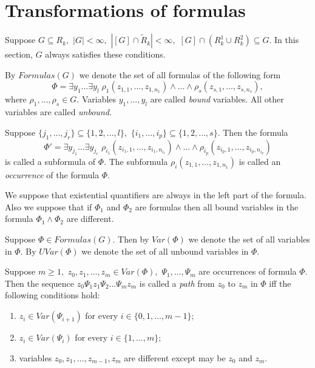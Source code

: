 \documentclass{au}
\theoremstyle{plain}
\theoremstyle{definition}
\theoremstyle{remark}
\numberwithin{equation}{section}
\begin{document}
\section{Transformations of formulas}

Suppose $G\subseteq R_{k},$ $|G|<\infty,$ $|[G]\cap \widetilde R_{k}|<\infty,$
$[G]\cap (R_{k}^{1}\cup R_{k}^{2}) \subseteq G.$
In this section, $G$ always satisfies these conditions.

By $Formulas(G)$ we denote the set of all formulas of the following form
$$\Phi = \exists
y_{1}\ldots \exists y_{l} \;
\rho_{1}(z_{1,1},\ldots,z_{1,n_{1}})\wedge \ldots \wedge
\rho_{s}(z_{s,1},\ldots,z_{s,n_{s}}),$$
where $\rho_{1},\ldots,\rho_{s}\in G.$
Variables $y_{1},\ldots,y_{l}$ are called \emph{bound} variables.
All other variables are called \emph{unbound}.

Suppose $\{j_{1},\ldots,j_{r}\}\subseteq \{1,2,\ldots,l\},$
$\{i_{1},\ldots,i_{p}\}\subseteq \{1,2,\ldots,s\}.$
Then the formula
$$\Phi' = \exists
y_{j_{1}}\ldots \exists y_{j_{r}} \;
\rho_{i_{1}}(z_{i_{1},1},\ldots,z_{i_{1},n_{i_{1}}})\wedge \ldots \wedge
\rho_{i_{p}}(z_{i_{p},1},\ldots,z_{i_{p},n_{i_{p}}})$$
is called a subformula of $\Phi.$
The subformula $\rho_{i}(z_{1,1},\ldots,z_{1,n_{1}})$ is called
an \emph{occurrence} of the formula $\Phi.$

We suppose that existential quantifiers are always in the left part of the formula.
Also we suppose that if
$\Phi_{1}$ and $\Phi_{2}$ are formulas
then all bound variables in the formula
$\Phi_{1}\wedge \Phi_{2}$ are different.

Suppose $\Phi\in Formulas(G).$ Then by $Var(\Phi)$ we denote the set of all variables in $\Phi.$
By $UVar(\Phi)$ we denote the set of all unbound variables in $\Phi.$

Suppose 
$m\ge 1,$ $z_{0},z_{1},\ldots,z_{m}\in Var(\Phi),$
$\Psi_{1},\ldots,\Psi_{m}$ are occurrences of formula $\Phi.$
Then the sequence $z_{0}\Psi_{1}z_{1}\Psi_{2}\ldots \Psi_{m}z_{m}$
is called a \emph{path} from $z_{0}$ to $z_{m}$ in $\Phi$
iff the following conditions hold:

\begin{enumerate}

\item $z_{i}\in Var(\Psi_{i+1})$ 
for every $i\in \{0,1,\ldots,m-1\};$

\item $z_{i}\in Var(\Psi_{i})$ for every $i\in \{1,\ldots,m\};$

\item variables $z_{0},z_{1},\ldots,z_{m-1},z_{m}$ are different except may be $z_{0}$ and $z_{m}.$

\end{enumerate}
\end{document}

